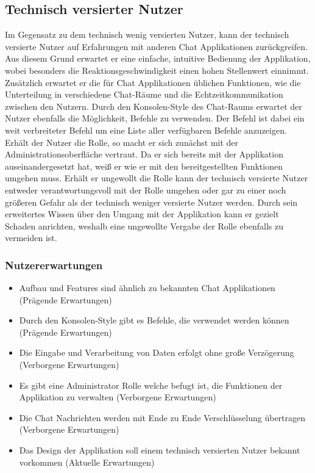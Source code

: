 \subsection{Technisch versierter Nutzer}
Im Gegensatz zu dem technisch wenig versierten Nutzer, kann der technisch versierte Nutzer auf Erfahrungen mit anderen Chat Applikationen zurückgreifen.
Aus diesem Grund erwartet er eine einfache, intuitive Bedienung der Applikation, wobei besonders die Reaktionsgeschwindigkeit einen hohen Stellenwert einnimmt.
Zusätzlich erwartet er die für Chat Applikationen üblichen Funktionen, wie die Unterteilung in verschiedene Chat-Räume und die Echtzeitkommunikation zwischen den Nutzern.
\newparagraph
Durch den Konsolen-Style des Chat-Raums erwartet der Nutzer ebenfalls die Möglichkeit, Befehle zu verwenden.
Der Befehl  ist dabei ein weit verbreiteter Befehl um eine Liste aller verfügbaren Befehle anzuzeigen.
\newparagraph
Erhält der Nutzer die  Rolle, so macht er sich zunächst mit der Administrationsoberfläche vertraut.
Da er sich bereits mit der Applikation auseinandergesetzt hat, weiß er wie er mit den bereitgestellten Funktionen umgehen muss.
Erhält er ungewollt die Rolle  kann der technisch versierte Nutzer entweder verantwortungsvoll mit der Rolle umgehen oder gar zu einer noch größeren Gefahr als der technisch weniger versierte Nutzer werden.
Durch sein erweitertes Wissen über den Umgang mit der Applikation kann er gezielt Schaden anrichten, weshalb eine ungewollte Vergabe der Rolle ebenfalls zu vermeiden ist.

\subsubsection{Nutzererwartungen}
\begin{itemize}
  \item Aufbau und Features sind ähnlich zu bekannten Chat Applikationen (Prägende Erwartungen)
  \item Durch den Konsolen-Style gibt es Befehle, die verwendet werden können (Prägende Erwartungen)
  \item Die Eingabe und Verarbeitung von Daten erfolgt ohne große Verzögerung (Verborgene Erwartungen)
  \item Es gibt eine Administrator Rolle welche befugt ist, die Funktionen der Applikation zu verwalten (Verborgene Erwartungen)
  \item Die Chat Nachrichten werden mit Ende zu Ende Verschlüsselung übertragen (Verborgene Erwartungen)
  \item Das Design der Applikation soll einem technisch versierten Nutzer bekannt vorkommen (Aktuelle Erwartungen)
\end{itemize}

